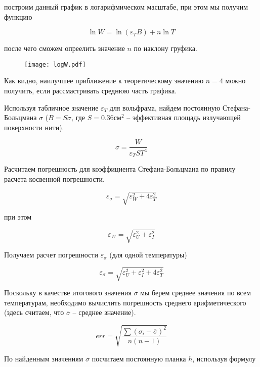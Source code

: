 	построим данный график в логарифмическом масштабе, при этом мы получим функцию

	\begin{equation*}
		\ln W = \ln (\varepsilon_T B) + n \ln T
	\end{equation*}

	после чего сможем опреелить значение $n$ по наклону груфика.

	\begin{figure}[h]
		\centering
		\texttt{[image: logW.pdf]}
		\label{fig:logW}
	\end{figure}

	Как видно, наилучшее приближение к теоретическому значению $n = 4$ можно получить, если рассмастривать среднюю часть графика.

	Используя табличное значение $\varepsilon_T$ для вольфрама, найдем постоянную Стефана-Больцмана $\sigma$ 
	($B = S \sigma$, где $S = 0.36 \text{см}^2$ -- эффективная площадь излучающей поверхности нити). 

	\[\sigma = \frac{W}{\varepsilon_T S T^4} \]

	Расчитаем погрешность для коэффициента Стефана-Больцмана по правилу расчета косвенной погрешности.

	\[ \varepsilon_{\sigma} = \sqrt{\varepsilon_W^2 + 4 \varepsilon_T^2} \]

	при этом

	\[ \varepsilon_W = \sqrt{\varepsilon_U^2 + \varepsilon_I^2} \]

	Получаем расчет погрешности $\varepsilon_{\sigma}$ (для одной температуры)

	\[ \varepsilon_{\sigma} = \sqrt{\varepsilon_U^2 + \varepsilon_I^2 + 4 \varepsilon_T^2} \]

	Поскольку в качестве итогового значения $\sigma$ мы берем среднее значения по всем температурам,
	необходимо вычислить погрешность среднего арифметического (здесь считаем, что 
	$\overline{\sigma}$ -- среднее значение).

	\[ err = \sqrt{\frac{\sum (\sigma_i - \overline{\sigma})^2}{n(n - 1)}} \]

	

	\begin{center}
	\end{center}

	По найденным значениям $\sigma$ посчитаем постоянную планка $h$, используя формулу

